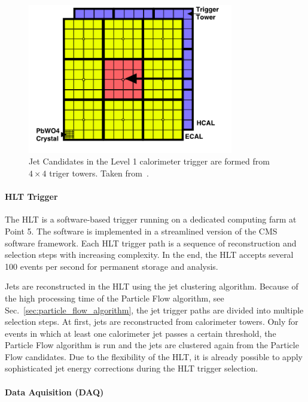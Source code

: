 \begin{figure}[htp]
    \centering
    \includegraphics[width=0.8\textwidth]{figures/cms_detector/l1_calo_towers.png}\hfill
    \caption[Jet Candidates in the Level 1 calorimeter trigger]{Jet Candidates
        in the Level 1 calorimeter trigger are formed from $4\times4$ triger
        towers. Taken from~\cite{Rose:2009zz}.}
    \label{fig:cms:l1_calo_towers}
\end{figure}

\paragraph{HLT Trigger} 
The HLT is a software-based trigger running on a dedicated computing farm at
Point 5. The software is implemented in a streamlined version of the CMS
software framework. Each HLT trigger path is a sequence of reconstruction and
selection steps with increasing complexity. In the end, the HLT accepts several
100 events per second for permanent storage and analysis.

Jets are reconstructed in the HLT using the \antikt jet clustering algorithm. Because of the
high processing time of the Particle Flow algorithm, see
Sec.~\ref{sec:particle_flow_algorithm}, the jet trigger paths are divided into
multiple selection steps. At first, jets are reconstructed from calorimeter
towers.  Only for events in which at least one calorimeter jet passes a certain
\pt threshold, the Particle Flow algorithm is run and the jets are clustered
again from the Particle Flow candidates. Due to the flexibility of the HLT, it
is already possible to apply sophisticated jet energy corrections during the HLT
trigger selection.

\paragraph{Data Aquisition (DAQ)}

